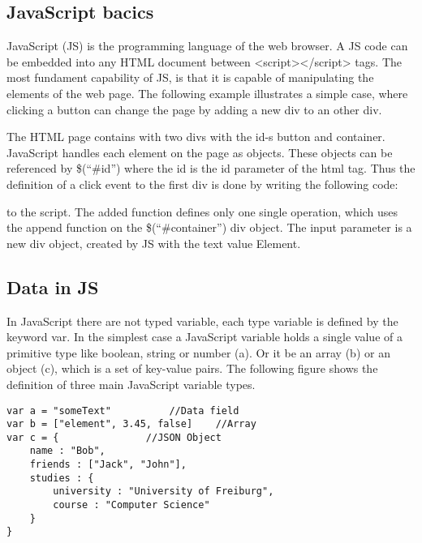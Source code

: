 

\subsection{JavaScript bacics}

JavaScript (JS) is the programming language of the web browser. A JS code can be embedded into any HTML document between <script></script> tags. The most fundament capability of JS, is that it is capable of manipulating the elements of the web page. The following example illustrates a simple case, where clicking a button can change the page by adding a new div to an other div.


The HTML page contains with two divs with the id-s button and container. JavaScript handles each element on the page as objects. These objects can be referenced by \$(“\#id”) where the id is the id parameter of the html tag. Thus the definition of a click event to the first div is done by writing the following code:


to the script. The added function defines only one single operation, which uses the append function on the \$(“\#container”) div object. The input parameter is a new div object, created by JS with the text value Element. 


\subsection{Data in JS}

In JavaScript there are not typed variable, each type variable is defined by the keyword var. In the simplest case a JavaScript variable holds a single value of a  primitive type like boolean, string or number (a). Or it be an array (b) or an object (c), which is a set of key-value pairs. The following figure shows the definition of three main JavaScript variable types.


\begin{lstlisting}[basicstyle=\footnotesize, frame=single, caption={JavaScript data types}, captionpos=b]
var a = "someText"			//Data field
var b = ["element", 3.45, false]	//Array
var c = {				//JSON Object
	name : "Bob",
	friends : ["Jack", "John"],
	studies : {
		university : "University of Freiburg",
		course : "Computer Science"
	}		
}
\end{lstlisting}


